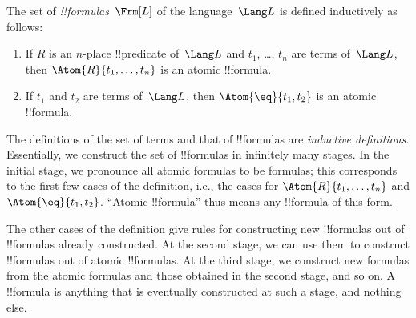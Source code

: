 \documentclass[../../../include/open-logic-section]{subfiles}
\begin{document}
\begin{defn}[Formula]
The set of \emph{!!{formula}s}~$\Frm[L]$ of the language~$\Lang L$
is defined inductively as follows:
\begin{enumerate}


\item If $R$ is an $n$-place !!{predicate} of~$\Lang L$ and $t_1$, \dots,
  $t_n$ are terms of~$\Lang L$, then $\Atom{R}{t_1,\ldots, t_n}$ is an
  atomic !!{formula}.

\item If $t_1$ and $t_2$ are terms of~$\Lang L$, then $\Atom{\eq}{t_1, t_2}$
  is an atomic !!{formula}.








\end{enumerate}
\end{defn}

\begin{explain}
The definitions of the set of terms and that of !!{formula}s are
\emph{inductive definitions}.  Essentially, we construct the set of
!!{formula}s in infinitely many stages.  In the initial stage, we
pronounce all atomic formulas to be formulas; this corresponds to the
first few cases of the definition, i.e., the cases for
%
%
$\Atom{R}{t_1,\dots,t_n}$ and $\Atom{\eq}{t_1,t_2}$.  ``Atomic !!{formula}''
thus means any !!{formula} of this form.

The other cases of the definition give rules for constructing new
!!{formula}s out of !!{formula}s already constructed.  At the second
stage, we can use them to construct !!{formula}s out of atomic
!!{formula}s.  At the third stage, we construct new formulas from the
atomic formulas and those obtained in the second stage, and so on.  A
!!{formula} is anything that is eventually constructed at such a
stage, and nothing else.
\end{explain}
\end{document}

